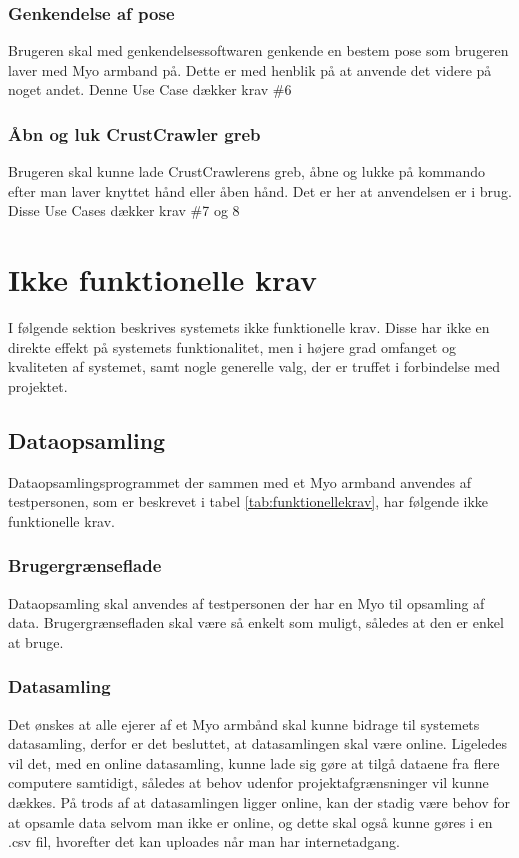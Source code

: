 \subsubsection{Genkendelse af pose}
Brugeren skal med genkendelsessoftwaren genkende en bestem pose som brugeren laver med Myo armband på. Dette er med henblik på at anvende det videre på noget andet. Denne Use Case dækker krav \#6
\subsubsection{Åbn og luk CrustCrawler greb}
Brugeren skal kunne lade CrustCrawlerens greb, åbne og lukke på kommando efter man laver knyttet hånd eller åben hånd. Det er her at anvendelsen er i brug. Disse Use Cases dækker krav \#7 og 8

\section{Ikke funktionelle krav}
\label{sec:ikkefunktionellekrav}
I følgende sektion beskrives systemets ikke funktionelle krav. Disse har ikke en direkte effekt på systemets funktionalitet, men i højere grad omfanget og kvaliteten af systemet, samt nogle generelle valg, der er truffet i forbindelse med projektet.

\subsection{Dataopsamling}
Dataopsamlingsprogrammet der sammen med et Myo armband anvendes af testpersonen, som er beskrevet i tabel \ref{tab:funktionellekrav}, har følgende ikke funktionelle krav.

\subsubsection{Brugergrænseflade}
Dataopsamling skal anvendes af testpersonen der har en Myo til opsamling af data. Brugergrænsefladen skal være så enkelt som muligt, således at den er enkel at bruge.

\subsubsection{Datasamling}
Det ønskes at alle ejerer af et Myo armbånd skal kunne bidrage til systemets datasamling, derfor er det besluttet, at datasamlingen skal være online. Ligeledes vil det, med en online datasamling, kunne lade sig gøre at tilgå dataene fra flere computere samtidigt, således at behov udenfor projektafgrænsninger vil kunne dækkes. På trods af at datasamlingen ligger online, kan der stadig være behov for at opsamle data selvom man ikke er online, og dette skal også kunne gøres i en .csv fil, hvorefter det kan uploades når man har internetadgang.

